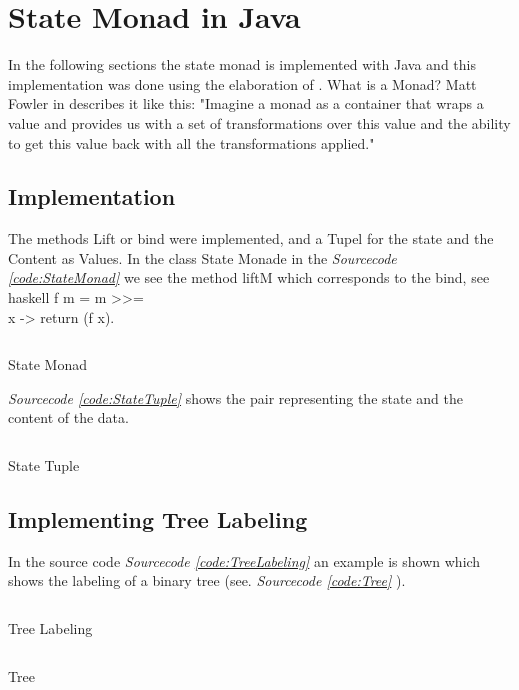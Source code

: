 \documentclass[a4paper,12pt,twoside]{scrreprt}
\begin{document}
\section{State Monad in Java}
In the following sections the state monad is implemented with Java and this implementation was done using the elaboration of \cite{muzietto_state_2014}.
\newline
What is a Monad? 
Matt Fowler in \cite{fowler_understanding_2015} describes it like this:
"Imagine a monad as a container that wraps a value and provides us with a set of transformations over this value and the ability to get this value back with all the transformations applied."

\subsection{Implementation}
The methods Lift or bind were implemented, and a Tupel for the state and the Content as Values.
In the class State Monade in the  \emph{Sourcecode \ref{code:StateMonad}} we see the method liftM which corresponds to the bind, see haskell f m = m >>= \\x -> return (f x).
\begin{listing}[ht]
    \inputminted[fontsize=\footnotesize,linenos]{java}{./code/statemonad/StateMonad.java}
    \caption[State Monad]{State Monad}
    \label{code:StateMonad}
\end{listing}
\clearpage

\emph{Sourcecode \ref{code:StateTuple}} shows the pair representing the state and the content of the data.
\begin{listing}[ht]
    \inputminted[fontsize=\footnotesize,linenos]{java}{./code/statemonad/StateTuple.java}
    \caption[State Tuple]{State Tuple}
    \label{code:StateTuple}
\end{listing}
\clearpage

\subsection{Implementing Tree Labeling}
In the source code \emph{Sourcecode \ref{code:TreeLabeling}} an example is shown which shows the labeling of a binary tree (see. \emph{Sourcecode \ref{code:Tree}} ).
\begin{listing}[ht]
    \inputminted[fontsize=\footnotesize,linenos]{java}{./code/statemonad/Labelling.java}
    \caption[Tree Labeling]{Tree Labeling}
    \label{code:TreeLabeling}
\end{listing}
\clearpage

\begin{listing}[ht]
    \inputminted[fontsize=\footnotesize,linenos]{java}{./code/statemonad/Tree.java}
    \caption[Tree]{Tree}
    \label{code:Tree}
\end{listing}
\clearpage

\clearpage
{}
{}
\printbibliography
\end{document}
